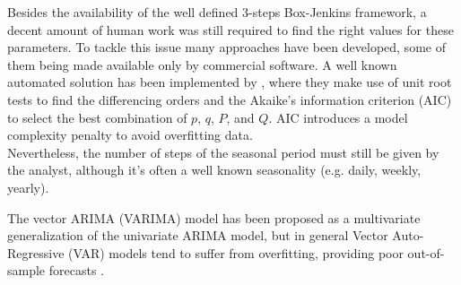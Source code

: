 \documentclass[a4paper]{article} %
\begin{document}
	Besides the availability of the well defined 3-steps Box-Jenkins framework, a decent amount of human work was still required to find the right values for these parameters. To tackle this issue many approaches have been developed, some of them being made available only by commercial software.  A well known automated solution has been implemented by \cite{AutoForecasting}, where they make use of unit root tests to find the differencing orders and the Akaike's information criterion (AIC) to select the best combination of $p$, $q$, $P$, and $Q$. AIC introduces a model complexity penalty to avoid overfitting data.\\
	Nevertheless, the number of steps of the seasonal period must still be given by the analyst, although it's often a well known seasonality (e.g. daily, weekly, yearly).
		
	The vector ARIMA (VARIMA) model has been proposed as a multivariate generalization of the univariate ARIMA model, but in general Vector Auto-Regressive (VAR) models tend to suffer from overfitting, providing poor out-of-sample forecasts \cite{25YearsForecasting}.
	
\end{document}
